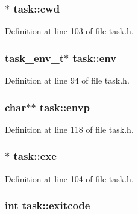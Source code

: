 \hypertarget{structtask_a7099e7ba6a4c94559edfb4d396803b15}{
\subsubsection[{cwd}]{$\ast$ task\+::cwd}}\label{structtask_a7099e7ba6a4c94559edfb4d396803b15}


Definition at line 103 of file task.\+h.

\hypertarget{structtask_a8dbbb79f7c29771d36f1d98ec84cbbdf}{
\subsubsection[{env}]{\setlength{\rightskip}{0pt plus 5cm}task\+\_\+env\+\_\+t$\ast$ task\+::env}}\label{structtask_a8dbbb79f7c29771d36f1d98ec84cbbdf}


Definition at line 94 of file task.\+h.

\hypertarget{structtask_a09fbc78d666a0b49e2e2064121d28364}{
\subsubsection[{envp}]{\setlength{\rightskip}{0pt plus 5cm}char$\ast$$\ast$ task\+::envp}}\label{structtask_a09fbc78d666a0b49e2e2064121d28364}


Definition at line 118 of file task.\+h.

\hypertarget{structtask_a22a59fcfc18d5f671340669f96571768}{
\subsubsection[{exe}]{$\ast$ task\+::exe}}\label{structtask_a22a59fcfc18d5f671340669f96571768}


Definition at line 104 of file task.\+h.

\hypertarget{structtask_a9bd7bbd83fe1f4744c76ff240b6da5db}{
\subsubsection[{exitcode}]{\setlength{\rightskip}{0pt plus 5cm}int task\+::exitcode}}\label{structtask_a9bd7bbd83fe1f4744c76ff240b6da5db}


